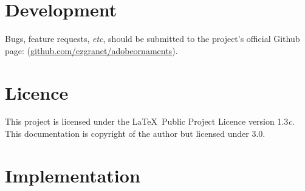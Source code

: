 \documentclass[12pt]{article}
\begin{document}
\normalfont
 

\section{Development}
Bugs, feature requests, \textit{etc}, should be submitted to the project's official Github page: (\url{github.com/ezgranet/adobeornaments}).
\section{Licence}
	This project is licensed under the \LaTeX\ Public Project Licence version 1.3\textit{c}. This documentation is copyright of the author but licensed under  3.0.
	\clearpage 
\section{Implementation}
\end{document}
